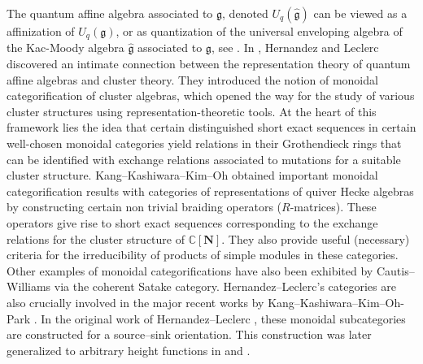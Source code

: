 \documentclass[12pt]{amsart}
\theoremstyle{plain}
\theoremstyle{definition}
\numberwithin{equation}{section}
\newcommand{\CN}{\mathbb{C}[\mathbf{N}]}
\begin{document}
The quantum affine algebra associated to $\mathfrak{g}$, denoted $U_q(\widehat{\mathfrak{g}})$ can be viewed as a affinization of $U_q(\mathfrak{g})$, or as quantization of the universal enveloping algebra of the Kac-Moody algebra $\widehat{\mathfrak{g}}$ associated to $\mathfrak{g}$, see \cite{CP95a}. In \cite{HL10}, Hernandez and Leclerc discovered an intimate connection between the representation theory of quantum affine algebras and cluster theory. They introduced the notion of monoidal categorification of cluster algebras, which opened the way for the study of various cluster structures using representation-theoretic tools. At the heart of this framework lies the idea that certain distinguished short exact sequences in certain well-chosen monoidal categories yield relations in their Grothendieck rings that can be identified with exchange relations associated to mutations for a suitable cluster structure.  Kang--Kashiwara--Kim--Oh \cite{KKKO18} obtained important monoidal categorification results with categories of representations of quiver Hecke algebras by constructing certain non trivial braiding operators ($R$-matrices). These operators give rise to short exact sequences corresponding to the exchange relations for the cluster structure of $\CN$.  They also provide useful (necessary) criteria for the irreducibility of products of simple modules in these categories. Other examples of monoidal categorifications have also been exhibited by Cautis--Williams \cite{CW19} via the coherent Satake category. Hernandez--Leclerc's categories are also crucially involved in the major recent works by Kang--Kashiwara--Kim--Oh-Park \cite{KKK18,KKKO18,KKOP24}. In the original work of Hernandez--Leclerc \cite{HL10}, these monoidal subcategories are constructed for a source--sink orientation. This construction was later generalized to arbitrary height functions in \cite{HL15} and \cite{kashiwara2020monoidal,KKOP24}.
\end{document}
